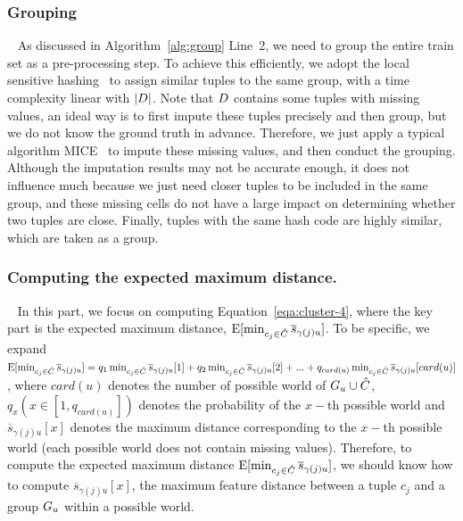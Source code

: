 \subsubsection{Grouping}~\label{subsec:clustering}
As discussed in Algorithm~\ref{alg:group} Line~2, we need to group the entire train set as a pre-processing step. To achieve this efficiently, we adopt the local sensitive hashing~\cite{DBLP:conf/focs/AndoniI06} to assign similar tuples to the same group, with a time complexity linear with $|D|$.
%
Note that $D$ contains some tuples with missing values, an ideal way is to first impute these tuples precisely and then group, but we do not know the ground truth in advance. Therefore, we just apply a typical algorithm \ie MICE~\cite{royston2011multiple} to impute these missing values, and then conduct the grouping. Although the imputation results may  not be accurate enough, it does not influence much because we just need closer tuples to be included in the same group, and these missing cells do not have a large impact on determining whether two tuples are close. 
%
Finally, tuples with the same hash code are highly similar, which are taken as a group.

 


\subsubsection{Computing the expected maximum distance.}~\label{subsec:pq} In this part, we focus on computing Equation~\ref{eqa:cluster-4}, where the key part is the expected maximum distance, \ie $\mathrm{E}[\min_{c_j\in \hat{C}}\overline{s}_{\gamma(j)u}]$. To be specific, we expand $\mathrm{E}[\min_{c_j\in \hat{C}}\overline{s}_{\gamma(j)u}] = q_1\min_{c_j\in \hat{C}}\overline{s}_{\gamma(j)u}[1] + q_2\min_{c_j\in \hat{C}}\overline{s}_{\gamma(j)u}[2] + ... +q_{card(u)}\min_{c_j\in \hat{C}}\overline{s}_{\gamma(j)u}[card(u)]$, where $card(u)$ denotes the number of possible world of $G_u \cup \hat{C}$, $q_x    (x\in [1, q_{card(u)}])$ denotes the probability of the $x-$th possible world and  $\overline{s}_{\gamma(j)u}[x]$ denotes the maximum distance  corresponding to the $x-$th possible world (each possible world does not contain missing values). 
%
%
%
Therefore, to compute the expected maximum distance $\mathrm{E}[\min_{c_j\in \hat{C}}\overline{s}_{\gamma(j)u}]$, we should know how to compute $\overline{s}_{\gamma(j)u}[x]$, \ie the  maximum feature distance between a tuple $c_j$ and a group $G_u$ within a possible world.

